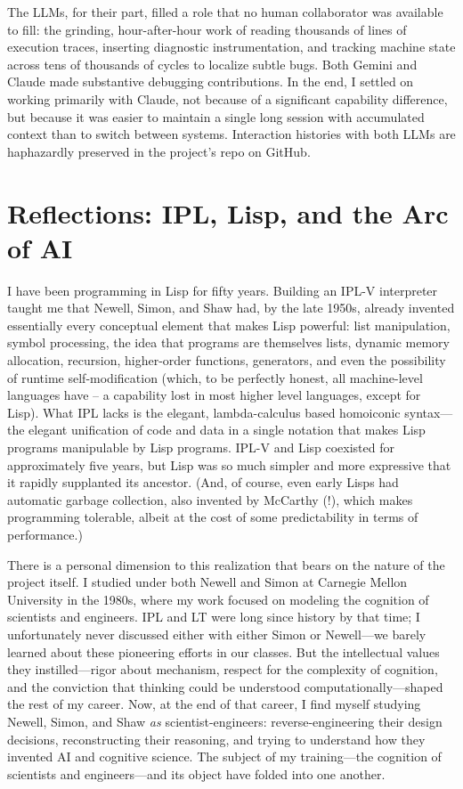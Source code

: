 \documentclass[journal]{IEEEtran}
\begin{document}
The LLMs, for their part, filled a role that no human collaborator was
available to fill: the grinding, hour-after-hour work of reading
thousands of lines of execution traces, inserting diagnostic
instrumentation, and tracking machine state across tens of thousands
of cycles to localize subtle bugs. Both Gemini and Claude made
substantive debugging contributions. In the end, I settled on working
primarily with Claude, not because of a significant capability
difference, but because it was easier to maintain a single long
session with accumulated context than to switch between
systems. Interaction histories with both LLMs are haphazardly preserved
in the project's repo on GitHub.

\section{Reflections: IPL, Lisp, and the Arc of AI}
\label{sec:reflections}

I have been programming in Lisp for fifty years. Building an IPL-V
interpreter taught me that Newell, Simon, and Shaw had, by the late
1950s, already invented essentially every conceptual element that
makes Lisp powerful: list manipulation, symbol processing, the idea
that programs are themselves lists, dynamic memory allocation,
recursion, higher-order functions, generators, and even the
possibility of runtime self-modification (which, to be perfectly
honest, all machine-level languages have -- a capability lost in most
higher level languages, except for Lisp). What IPL lacks is the
elegant, lambda-calculus based homoiconic syntax---the elegant
unification of code and data in a single notation that makes Lisp
programs manipulable by Lisp programs.  IPL-V and Lisp coexisted for
approximately five years, but Lisp was so much simpler and more
expressive that it rapidly supplanted its ancestor. (And, of course,
even early Lisps had automatic garbage collection, also invented by
McCarthy (!), which makes programming tolerable, albeit at the cost
of some predictability in terms of performance.)

There is a personal dimension to this realization that bears on the
nature of the project itself. I studied under both Newell and Simon at
Carnegie Mellon University in the 1980s, where my work focused on
modeling the cognition of scientists and engineers. IPL and LT were
long since history by that time; I unfortunately never discussed
either with either Simon or Newell---we barely learned about these
pioneering efforts in our classes. But the intellectual values they
instilled---rigor about mechanism, respect for the complexity of
cognition, and the conviction that thinking could be understood
computationally---shaped the rest of my career. Now, at the end of
that career, I find myself studying Newell, Simon, and Shaw
\textit{as} scientist-engineers: reverse-engineering their design
decisions, reconstructing their reasoning, and trying to understand
how they invented AI and cognitive science. The subject of my
training---the cognition of scientists and engineers---and its object
have folded into one another.
\end{document}
